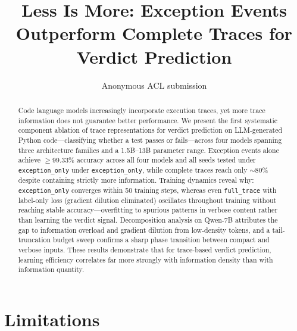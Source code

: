 \documentclass[11pt,a4paper]{article}
\title{Less Is More: Exception Events Outperform Complete Traces for Verdict Prediction}
\author{Anonymous ACL submission}
\begin{document}
\maketitle

\begin{abstract}
Code language models increasingly incorporate execution traces, yet more trace information does not guarantee better performance.
We present the first systematic component ablation of trace representations for verdict prediction on LLM-generated Python code---classifying whether a test passes or fails---across four models spanning three architecture families and a 1.5B--13B parameter range.
Exception events alone achieve ${\geq}$99.33\% accuracy across all four models and all seeds tested under \texttt{exception\_only} under \texttt{exception\_only}, while complete traces reach only ${\sim}$80\% despite containing strictly more information.
Training dynamics reveal why: \texttt{exception\_only} converges within 50 training steps, whereas even \texttt{full\_trace} with label-only loss (gradient dilution eliminated) oscillates throughout training without reaching stable accuracy---overfitting to spurious patterns in verbose content rather than learning the verdict signal.
Decomposition analysis on Qwen-7B attributes the gap to information overload and gradient dilution from low-density tokens, and a tail-truncation budget sweep confirms a sharp phase transition between compact and verbose inputs.
These results demonstrate that for trace-based verdict prediction, learning efficiency correlates far more strongly with information density than with information quantity.
\end{abstract}








\section*{Limitations}
\end{document}
